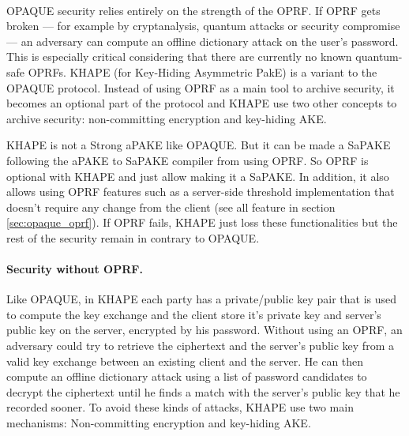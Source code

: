 ﻿\documentclass[../report.tex]{subfiles}
\begin{document}
\paragraph{}
OPAQUE security relies entirely on the strength of the OPRF. If OPRF gets broken --- for example by cryptanalysis, quantum attacks or security compromise --- an adversary can compute an offline dictionary attack on the user's password. This is especially critical considering that there are currently no known quantum-safe OPRFs.
KHAPE (for Key-Hiding Asymmetric PakE) \cite{KHAPE_Paper} is a variant to the OPAQUE protocol. Instead of using OPRF as a main tool to archive security, it becomes an optional part of the protocol and KHAPE use two other concepts to archive security: non-committing encryption and key-hiding AKE.

KHAPE is not a Strong aPAKE like OPAQUE. But it can be made a SaPAKE following the aPAKE to SaPAKE compiler from \cite{OPAQUE_Paper} using OPRF.
So OPRF is optional with KHAPE and just allow making it a SaPAKE. In addition, it also allows using OPRF features such as a server-side threshold implementation that doesn't require any change from the client (see all feature in section \ref{sec:opaque_oprf}). If OPRF fails, KHAPE just loss these functionalities but the rest of the security remain in contrary to OPAQUE.



\paragraph{Security without OPRF.}
Like OPAQUE, in KHAPE each party has a private/public key pair that is used to compute the key exchange and the client store it's private key and server's public key on the server, encrypted by his password.
Without using an OPRF, an adversary could try to retrieve the ciphertext and the server's public key from a valid key exchange between an existing client and the server.
He can then compute an offline dictionary attack using a list of password candidates to decrypt the ciphertext until he finds a match with the server's public key that he recorded sooner.
To avoid these kinds of attacks, KHAPE use two main mechanisms: Non-committing encryption and key-hiding AKE.
\end{document}
